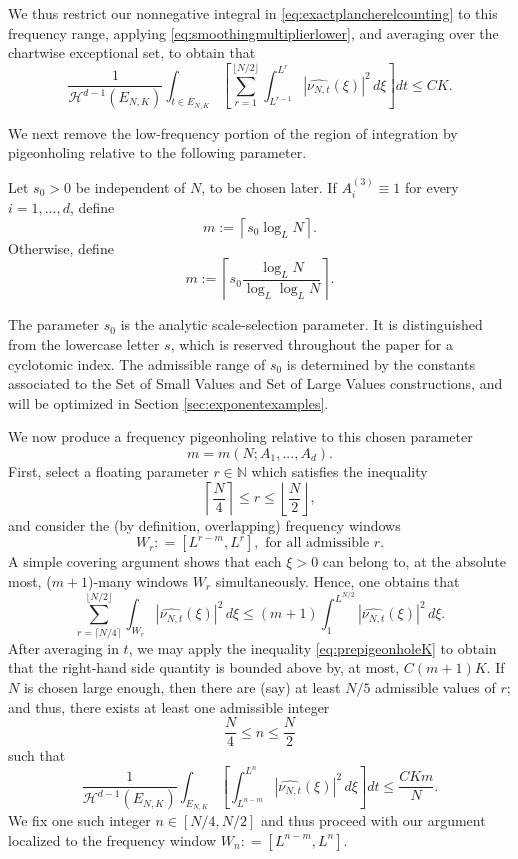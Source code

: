 \documentclass[12pt]{amsart}
\numberwithin{equation}{section}
\begin{document}
We thus restrict our nonnegative integral in
\eqref{eq:exactplancherelcounting} to this frequency range, applying
\eqref{eq:smoothingmultiplierlower}, and averaging over the chartwise exceptional set, to obtain that 
\begin{equation}\label{eq:prepigeonholeK}
\frac{1}{\mathcal H^{d-1}(E_{N,K})}
\int_{t\in E_{N,K}}
\left[
 \sum_{r=1}^{\lfloor N/2\rfloor}
 \int_{L^{r-1}}^{L^r}
 \left|\widehat{\nu_{N,t}}(\xi)\right|^2\,d\xi
\right]dt
\leq CK.
\end{equation}

We next remove the low-frequency portion of the region of integration by pigeonholing relative to the following parameter.

\medskip

\begin{definition}\label{def:littlem}
Let $s_0>0$ be independent of $N$, to be chosen later. If
$A_i^{(3)}\equiv1$ for every $i=1,\ldots,d$, define
\[
m:=\left\lceil s_0\log_LN\right\rceil.
\]
Otherwise, define
\[
m:=
\left\lceil
s_0\frac{\log_LN}{\log_L\log_LN}
\right\rceil.
\]
\end{definition}

The parameter $s_0$ is the analytic scale-selection parameter. It is distinguished from the lowercase letter $s$, which is reserved throughout the paper for a cyclotomic index. The admissible range of $s_0$ is determined by the constants associated to the Set of Small Values and Set of Large Values constructions, and will be optimized in Section \ref{sec:exponentexamples}.

We now produce a frequency pigeonholing relative to this chosen parameter
\[
m = m(N; A_1,...,A_d).
\]
First, select a floating parameter $r \in \mathbb{N}$ which satisfies the inequality
\[
\left\lceil\frac N4\right\rceil
\leq r\leq
\left\lfloor\frac N2\right\rfloor,
\]
and consider the (by definition, overlapping) frequency windows
\[
W_r : =[L^{r-m},L^r], \textrm{ for all admissible } r.
\]
A simple covering argument shows that each $\xi > 0$ can belong to, at the absolute most, ($m+1$)-many windows $W_r$ simultaneously. Hence, one obtains that 
\[
\sum_{r=\lceil N/4\rceil}^{\lfloor N/2\rfloor}
\int_{W_r}
\left|\widehat{\nu_{N,t}}(\xi)\right|^2\,d\xi
\leq
(m+1)\int_1^{L^{N/2}}
\left|\widehat{\nu_{N,t}}(\xi)\right|^2\,d\xi.
\]
After averaging in $t$, we may apply the inequality \eqref{eq:prepigeonholeK} to obtain that the right-hand side quantity is bounded above by, at most, $C(m+1)K$. If $N$ is chosen large enough, then there are (say) at least $N/5$ admissible values of $r$; and thus, there exists at least one admissible integer
\[
\frac N4\leq n\leq\frac N2
\]
such that
\begin{equation}\label{eq:averagingoverbadpigeonhole}
\frac{1}{\mathcal H^{d-1}(E_{N,K})}
\int_{E_{N,K}}
\left[
 \int_{L^{n-m}}^{L^n}
 \left|\widehat{\nu_{N,t}}(\xi)\right|^2\,d\xi
\right]dt
\leq\frac{CKm}{N}.
\end{equation}
We fix one such integer $n \in [N/4, N/2]$ and thus proceed with our argument localized to the frequency window $W_n : = [L^{n - m}, L^n]$.
\end{document}
